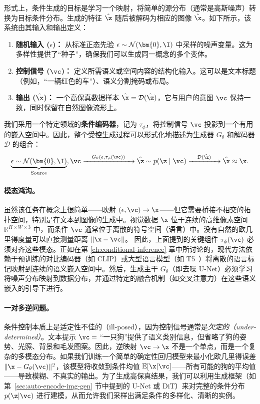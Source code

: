 \documentclass[../../book-main_zh.tex]{subfiles}
\begin{document}
形式上，条件生成的目标是学习一个映射，将简单的源分布（通常是高斯噪声）转换为目标条件分布。生成的特征 $\hat{\z}$ 随后被解码为相应的图像 $\hat{\x}$。如下所示，该系统由其输入和输出定义：
\begin{enumerate}
    \item \textbf{随机输入 ($\epsilon$)：} 从标准正态先验 $\epsilon \sim \mathcal{N}(\bm{0}, \I)$ 中采样的噪声变量。这为多样性提供了“种子”，确保我们可以生成同一概念的多个变体。
    \item \textbf{控制信号 ($\vc$)：} 定义所需语义或空间内容的结构化输入。这可以是文本标题（例如，“一辆红色的车”）、语义分割掩码或布局。
    \item \textbf{输出 ($\hat{\x}$)：} 一个高保真数据样本 $\hat{\x} = \mathcal{D}(\hat{\z})$，它与用户的意图 $\vc$ 保持一致，同时保留在自然图像流形上。
\end{enumerate}
我们采用一个特定领域的\textbf{条件编码器}，记为 $\tau_\phi$，将控制信号 $\vc$ 投影到一个有用的嵌入空间中。因此，整个受控生成过程可以形式化地描述为生成器 $G_\theta$ 和解码器 $\mathcal{D}$ 的组合：
\begin{equation}
    \underbrace{\epsilon \sim \mathcal{N}(\bm{0}, \I)}_{\text{Source}}, \vc
    \xrightarrow{\quad G_\theta(\epsilon, \tau_\phi(\vc)) \quad}
    \hat{\z} \sim p(\z\mid \vc)
    \xrightarrow{\quad \mathcal{D}(\hat{\z}) \quad}
    \hat{\x} \approx \x.
\end{equation}

\paragraph{模态鸿沟。}
虽然该任务在概念上很简单——映射 $(\epsilon, \vc) \to \x$——但它需要桥接不相交的拓扑空间，特别是在文本到图像的生成中。视觉数据 $\x$ 位于连续的高维像素空间 $\mathbb{R}^{H \times W \times 3}$ 中，而条件 $\vc$ 通常位于离散的符号空间（语言）中。没有自然的欧几里得度量可以直接测量距离 $\| \x - \vc \|$。
因此，上面提到的关键组件 $\tau_\phi(\vc)$ 必须对齐这些模态。正如在第 \ref{ch:conditional-inference} 章中所讨论的，现代方法依赖于预训练的对比编码器（如 CLIP）或大型语言模型（如 T5~\citep{raffel2020exploring}）将离散的语言标记映射到连续的语义嵌入空间中。然后，生成主干 $G_\theta$（即去噪 U-Net）必须学习将噪声分布映射到数据分布，并通过特定的融合机制（如交叉注意力）在这些语义嵌入的引导下进行。

\paragraph{一对多逆问题。}
条件控制本质上是适定性不佳的（ill-posed），因为控制信号通常是\textit{欠定的（under-determined）}。文本提示 $\vc=$ “一只狗”提供了语义类别信息，但省略了狗的姿势、光照、背景和毛发图案。因此，逆映射 $\vc \to \x$ 不是一个单点，而是一个复杂的多模态分布。如果我们训练一个简单的确定性回归模型来最小化欧几里得误差 $\|\x - G_\theta(\vc)\|^2$，该模型将收敛到条件均值 $\mathbb{E}[\x|\vc]$——所有可能的狗的平均值——导致模糊、不真实的输出。为了生成高保真结果，我们可以利用生成框架（如第~\ref{sec:auto-encode-img-gen} 节中提到的 U-Net 或 DiT）来对完整的条件分布 $p(\z|\vc)$ 进行建模，从而允许我们采样出满足条件的多样化、清晰的实例。
\end{document}
